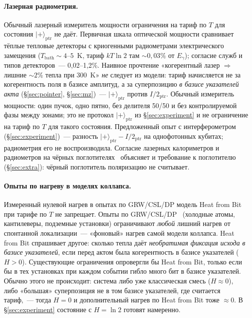 \documentclass[11pt,a4paper]{article}
\newcommand{\Sref}[1]{\hyperref[#1]{\S\ref{#1}}}
\begin{document}
\paragraph{Лазерная радиометрия.}
Обычный лазерный измеритель мощности ограничения на тариф по $T$ для состояния $|{+}\rangle_{\mathrm{ptr}}$ не даёт. Первичная шкала оптической мощности сравнивает тёплые тепловые детекторы с криогенными радиометрами электрического замещения ($T_{\mathrm{bath}}\sim 4$--$5$~K, тариф $kT\ln 2$ там $\sim 0{,}03\%$ от $E_{\gamma}$); согласие служб и типов детекторов~--- 0,02--1,2\%. Наивное прочтение «когерентный лазер $\Rightarrow$ лишние $\sim 2\%$ тепла при 300~K» \emph{не} следует из модели: тариф начисляется не за когерентность поля в базисе амплитуд, а за суперпозицию \emph{в базисе указателей акта} (\Sref{sec:pointer}, \Sref{sec:mz})~--- $|{+}\rangle_{\mathrm{ptr}}$ против $I/2_{\mathrm{ptr}}$. Обычный измеритель мощности: один пучок, одно пятно, без делителя 50/50 и без контролируемой фазы между зонами; это не протокол $|{+}\rangle_{\mathrm{ptr}}$ из \Sref{sec:experiment} и не ограничение на тариф по $T$ для такого состояния. Предложенный опыт с интерферометром (\Sref{sec:experiment})~--- разность $|{+}\rangle_{\mathrm{ptr}} - I/2_{\mathrm{ptr}}$ на однофотонных кубитах; радиометрия его не воспроизводила. Согласие лазерных калориметров и радиометров на чёрных поглотителях~\cite{lehman2004,spidell2021} объясняет и требование к поглотителю (\Sref{sec:extra}): чёрный поглотитель поляризацию не считывает.

\paragraph{Опыты по нагреву в моделях коллапса.}
Измеренный нулевой нагрев в опытах по GRW/CSL/DP модель Heat from Bit при тарифе по $T$ не запрещает. Опыты по GRW/CSL/DP~\cite{bassi2013,donadi2021} (холодные атомы, кантилеверы, подземные установки) ограничивают \emph{любой} лишний нагрев от спонтанной локализации~--- «фоновый» нагрев самой модели коллапса. Heat from Bit спрашивает другое: сколько тепла даёт \emph{необратимая фиксация исхода в базисе указателей}, если перед актом была когерентность в базисе указателей ($H>0$). Существующие ограничения опровергли бы Heat from Bit, только если бы в тех установках при каждом событии гибло много бит в базисе указателей. Обычно этого не происходит: система либо уже классическая смесь ($H\approx 0$), либо «большая» суперпозиция не в том базисе указателей, где считается тариф,~--- тогда $H=0$ и дополнительный нагрев по Heat from Bit тоже $\approx 0$. В \Sref{sec:experiment} состояние с $H=\ln 2$ готовят намеренно.
\end{document}
